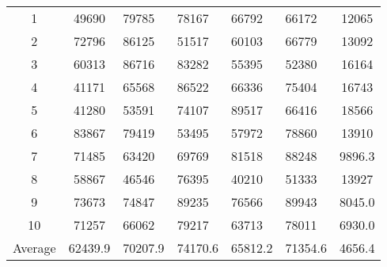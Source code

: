 \begin{table}[H]
\begin{tabular}{| c | c | l | l | l | l | c | }
1	&49690	&79785	&78167	&66792	&66172	&12065\\
2	&72796	&86125	&51517	&60103	&66779	&13092\\
3	&60313	&86716	&83282	&55395	&52380	&16164\\
4	&41171	&65568	&86522	&66336	&75404	&16743\\
5	&41280	&53591	&74107	&89517	&66416	&18566\\
6	&83867	&79419	&53495	&57972	&78860	&13910\\
7	&71485	&63420	&69769	&81518	&88248	&9896.3\\
8	&58867	&46546	&76395	&40210	&51333	&13927\\
9	&73673	&74847	&89235	&76566	&89943	&8045.0\\
10	&71257	&66062	&79217	&63713	&78011	&6930.0\\
Average	&62439.9	&70207.9	&74170.6	&65812.2	&71354.6	&4656.4\\\hline
\end{tabular}
\label{tab:normalised-images}
\end{table}
%